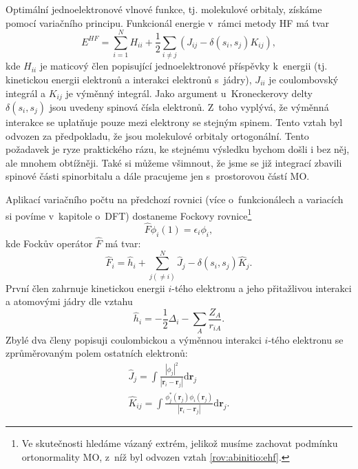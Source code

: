 Optimální jednoelektronové vlnové funkce, tj. molekulové orbitaly, získáme pomocí variačního principu. Funkcionál energie v~rámci metody HF má tvar 
\begin{equation}
E^{HF}= \sum_{i=1}^N H_{ii}+ \frac{1}{2}\sum_{i\neq j} (J_{ij}-\delta(s_{i},s_{j})K_{ij}),
\label{rov:abinitio:ehf}
\end{equation}
kde $H_{ii}$ je maticový člen popisující jednoelektronové příspěvky k~energii (tj. kinetickou energii elektronů a interakci elektronů s~jádry), $J_{ii}$ je coulombovský integrál a $K_{ij}$ je výměnný integrál.
Jako argument u~Kroneckerovy delty $\delta(s_{i},s_{j})$ jsou uvedeny spinová čísla elektronů. Z~toho vyplývá, že výměnná interakce se uplatňuje pouze mezi elektrony se stejným spinem.
Tento vztah byl odvozen za předpokladu, že jsou molekulové orbitaly ortogonální. Tento požadavek je ryze praktického rázu, ke stejnému výsledku bychom došli i bez něj, ale mnohem obtížněji. Také si můžeme všimnout, že jsme se již integrací zbavili spinové části spinorbitalu a dále pracujeme jen s~prostorovou částí MO.

Aplikací variačního počtu na předchozí rovnici (více o~funkcionálech a variacích si povíme v~kapitole o~DFT) dostaneme Fockovy rovnice\footnote{Ve skutečnosti hledáme vázaný extrém, jelikož musíme zachovat podmínku ortonormality MO, z~níž byl odvozen vztah \ref{rov:abinitio:ehf}.} 
\begin{equation}
\hat{F}\phi_i(1) = \epsilon_i \phi_i ,
\label{rov:abinitio:fockrov}  
\end{equation}
kde Fockův operátor $\hat{F}$ má tvar:
\begin{equation}
\hat{F}_i = \hat{h}_i+\sum^N_{j(\neq i)} \hat{J}_j - \delta(s_i,s_j) \hat{K}_j .
\label{rov:abinitio:fockoper}
\end{equation}
První člen zahrnuje  kinetickou energii $i$-tého elektronu a jeho přitažlivou interakci a atomovými jádry dle vztahu
\begin{equation}
\hat{h}_i = -\frac{1}{2}\Delta_i - \sum_{A}\frac{Z_A}{r_{iA}} .
\end{equation}
Zbylé dva členy popisuji coulombickou a výměnnou interakci $i$-tého elektronu se zprůměrovaným polem ostatních elektronů:
\begin{eqnarray}
\hat{J}_j=\int \frac{|\phi_j |^2}{|\textbf{r}_{i}-\textbf{r}_{j}|}\mathrm{d}\textbf{r}_j \\
\hat{K}_{ij} = \int \frac{\phi_j^*(\mathbf{r}_j)\phi_i(\mathbf{r}_j)}{|\textbf{r}_{i}-\textbf{r}_{j}|}\mathrm{d}\textbf{r}_j .
\end{eqnarray}

